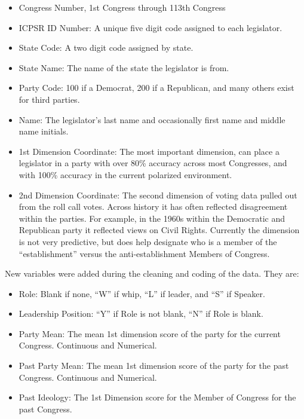 \documentclass[12pt,twoside]{reedthesis}
\begin{document}
  \begin{itemize}
  \itemsep1pt\parskip0pt
  \item
    Congress Number, 1st Congress through 113th Congress
  \item
    ICPSR ID Number: A unique five digit code assigned to each legislator.
  \item
    State Code: A two digit code assigned by state.
  \item
    State Name: The name of the state the legislator is from.
  \item
    Party Code: 100 if a Democrat, 200 if a Republican, and many others
    exist for third parties.
  \item
    Name: The legislator's last name and occasionally first name and
    middle name initials.
  \item
    1st Dimension Coordinate: The most important dimension, can place a
    legislator in a party with over 80\% accuracy across most Congresses,
    and with 100\% accuracy in the current polarized environment.
  \item
    2nd Dimension Coordinate: The second dimension of voting data pulled
    out from the roll call votes. Across history it has often reflected
    disagreement within the parties. For example, in the 1960s within the
    Democratic and Republican party it reflected views on Civil Rights.
    Currently the dimension is not very predictive, but does help
    designate who is a member of the ``establishment'' versus the
    anti-establishment Members of Congress.
  \end{itemize}
  
  New variables were added during the cleaning and coding of the data.
  They are:
  
  \begin{itemize}
  \itemsep1pt\parskip0pt
  \item
    Role: Blank if none, ``W'' if whip, ``L'' if leader, and ``S'' if
    Speaker.
  \item
    Leadership Position: ``Y'' if Role is not blank, ``N'' if Role is
    blank.
  \item
    Party Mean: The mean 1st dimension score of the party for the current
    Congress. Continuous and Numerical.
  \item
    Past Party Mean: The mean 1st dimension score of the party for the
    past Congress. Continuous and Numerical.
  \item
    Past Ideology: The 1st Dimension score for the Member of Congress for
    the past Congress.
  \end{itemize}
  
\end{document}
